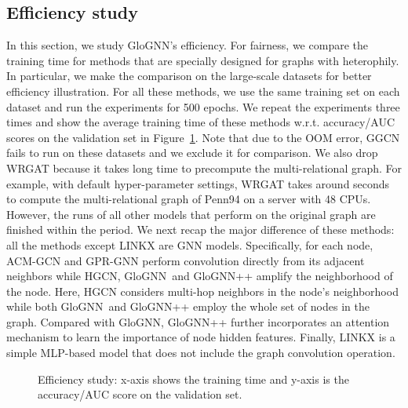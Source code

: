 \documentclass[nohyperref]{article}
\theoremstyle{plain}
\theoremstyle{definition}
\theoremstyle{remark}
\newcommand{\ada}{GloGNN}
\begin{document}
\subsection{Efficiency study}
In this section,
we study \ada's efficiency.
For fairness,
we compare the training time 
for methods that are specially designed for graphs with heterophily.
In particular,
we make the comparison on the large-scale datasets for better efficiency illustration.
For all these methods,
we use the same training set on each dataset and run the experiments for 500 epochs.
We repeat the experiments three times and show the average training time of these methods
w.r.t. accuracy/AUC scores on the validation set in Figure~\ref{figure:runtime}.
Note that
due to the OOM error,
GGCN fails to run on these datasets and
we exclude it for comparison.
We also drop WRGAT because it takes long time to precompute the multi-relational graph.
For example,
with default hyper-parameter settings,
WRGAT takes around  seconds to compute the multi-relational graph of Penn94 on a server with 48 CPUs.
However,
the runs of 
all other models that perform on the original graph are finished within the period.
We next recap the major difference of these methods:
all the methods except LINKX are GNN models.
Specifically,
for each node,
ACM-GCN and GPR-GNN perform convolution directly from its adjacent neighbors
while 
HGCN, \ada\ and \ada++ amplify the neighborhood of the node. 
Here,
HGCN 
considers multi-hop neighbors in the node's neighborhood while
both \ada\ and \ada++ employ the whole set of nodes in the graph.
Compared with \ada,
\ada++ further incorporates an attention mechanism 
to learn the importance of node hidden features.
Finally,
LINKX is a simple MLP-based model that does not include the graph convolution operation.


\begin{figure}[!htbp]
    \centering
     \caption{Efficiency study: x-axis shows the training time and y-axis is the accuracy/AUC score on the validation set.}
     \label{figure:runtime}
\end{figure}
\end{document}
